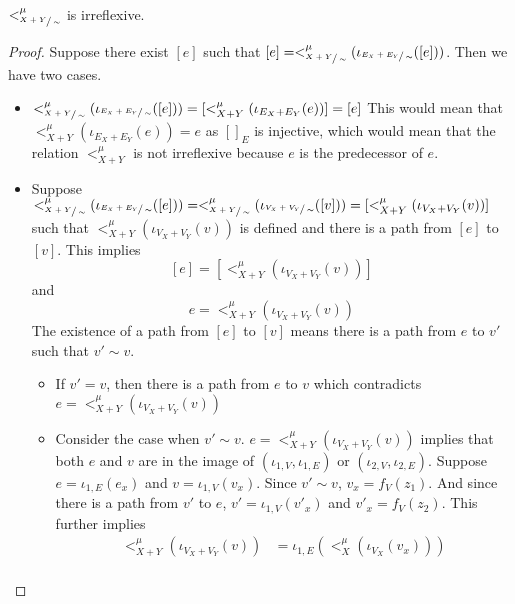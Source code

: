 
\begin{lemma}
\label{lemma:child_irreflexive}
    $<_{\sfrac{X+Y}{\sim}}^{\mu}$ is irreflexive.
\end{lemma}
\begin{proof}
    Suppose there exist $[e]$ such that $[e] = <_{\sfrac{X+Y}{\sim}}^{\mu}(\iota_{\sfrac{E_{X} + E_{Y}}{\sim}}([e]))$.
    Then we have two cases.
    \begin{itemize}
      \item $<_{\sfrac{X+Y}{\sim}}^{\mu}(\iota_{\sfrac{E_{X} + E_{Y}}{\sim}}([e])) = [<_{X+Y}^{\mu}(\iota_{E_{X} + E_{Y}}(e))] = [e]$
      This would mean that $<_{X+Y}^{\mu}(\iota_{E_{X} + E_{Y}}(e)) = e$ as $[]_{E}$ is injective, which would mean that the relation $<_{X+Y}^{\mu}$ is not irreflexive because $e$ is the predecessor of $e$.
      \item Suppose $<_{\sfrac{X+Y}{\sim}}^{\mu}(\iota_{\sfrac{E_{X} + E_{Y}}{\sim}}([e])) = <_{\sfrac{X+Y}{\sim}}^{\mu}(\iota_{\sfrac{V_{X} + V_{Y}}{\sim}}([v])) = [<_{X+Y}^{\mu}(\iota_{V_{X} + V_{Y}}(v))]$ such that $<_{X+Y}^{\mu}(\iota_{V_{X} + V_{Y}}(v))$ is defined and there is a path from $[e]$ to $[v]$.
            This implies
            \[
                [e] = [<_{X+Y}^{\mu}(\iota_{V_{X} + V_{Y}}(v))]
            \]
            and
            \[
               e = <_{X+Y}^{\mu}(\iota_{V_{X} + V_{Y}}(v))
            \]
            The existence of a path from $[e]$ to $[v]$ means there is a path from $e$ to $v'$ such that $v' \sim v$.
            \begin{itemize}
                \item If $v' = v$, then there is a path from $e$ to $v$ which contradicts $e = <_{X+Y}^{\mu}(\iota_{V_{X} + V_{Y}}(v))$
                \item Consider the case when $v' \sim v$.
                      $e = <_{X+Y}^{\mu}(\iota_{V_{X} + V_{Y}}(v))$ implies that both $e$ and $v$ are in the image of $(\iota_{1,V},\iota_{1,E})$ or $(\iota_{2,V},\iota_{2,E})$.
                      Suppose $e = \iota_{1,E}(e_{x})$ and $v = \iota_{1,V}(v_{x})$.
                      Since $v' \sim v$, $v_{x} = f_{V}(z_1)$. 
                      And since there is a path from $v'$ to $e$, $v' = \iota_{1,V}(v'_{x})$ and $v'_{x} = f_{V}(z_2)$.
                      This further implies
                      \begin{align*}
                        <_{X+Y}^{\mu}(\iota_{V_{X} + V_{Y}}(v)) &= \iota_{1,E}(<_{X}^{\mu}(\iota_{V_{X}}(v_{x})))\\

\end{align*}
\end{itemize}
\end{itemize}
\end{proof}

